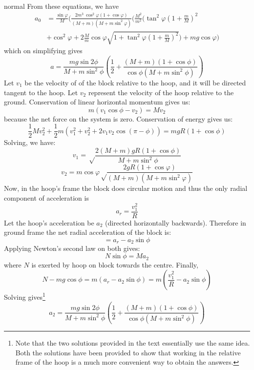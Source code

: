 \begin{solution}{normal}
From these equations, we have
\begin{align*}
a_0 &= \frac{\sin{\varphi}}{M} \Biggl(\frac{2m^3 \ \cos^2{\varphi} (1+\cos{\varphi})}{(M+m)(M+m\sin^2{\varphi})} \Biggl(\frac{M^2}{m^2} (\tan^2{\varphi} {\left(1+\frac{m}{M}\right)}^2 \\
&+ \cos^2{\varphi} + 2\frac{M}{m} \cos{\varphi} \sqrt{1+\tan^2{\varphi} {\left(1+\frac{m}{M}\right)}^2}\Biggr) +mg\cos{\varphi}\Biggr)
\end{align*}
which on simplifying gives
$$\boxed{a = \frac{mg\sin 2\phi}{M+m\sin^2\phi}\left ( \frac{1}{2}+\frac{(M+m)(1+\cos\phi)}{\cos\phi (M+m\sin^2\phi)} \right )}$$
\tcbline
Let $v_1$ be the velocity of of the block relative to the hoop, and it will be directed tangent to the hoop. Let $v_2$ represent the velocity of the hoop relative to the ground.
Conservation of linear horizontal momentum gives us:
$$m(v_{1}\cos \phi -v_{2})=Mv_{2}$$
because the net force on the system is zero. Conservation of energy gives us:
$$\frac{1}{2}Mv_{2}^2+\frac{1}{2}m(v_{1}^2+v_{2}^2+2v_{1}v_2 \cos(\pi-\phi))=mgR(1+\cos\phi)$$
Solving, we have:
$$v_{1}=\sqrt\frac{2(M+m)gR(1+\cos\phi)}{M+m\sin^2\phi}$$
$$\boxed{v_2 = m \cos{\varphi} \sqrt\frac{2gR(1+\cos\varphi)}{(M+m)(M+m\sin^2\varphi)}}$$
Now, in the hoop's frame the block does circular motion and thus the only radial component of acceleration is
$$a_{r}=\frac{v_1 ^2}{R}$$
Let the hoop's acceleration be $a_2$ (directed horizontally backwards). Therefore in ground frame the net radial acceleration of the block is:
$$=a_r -a_2 \sin \phi$$
Applying Newton's second law on both gives:
$$N\sin \phi=Ma_2$$
where $N$ is exerted by hoop on block towards the centre. Finally,
$$N-mg\cos\phi=m(a_r -a_2 \sin \phi)=m(\frac{v_1 ^2}{R}-a_2 \sin \phi)$$
Solving gives\footnote{Note that the two solutions provided in the text essentially use the same idea. Both the solutions have been provided to show that working in the relative frame of the hoop is a much more convenient way to obtain the answers.}
$$\boxed{a_2=\frac{mg\sin 2\phi}{M+m\sin^2\phi}\left ( \frac{1}{2}+\frac{(M+m)(1+\cos\phi)}{\cos\phi (M+m\sin^2\phi)} \right )}$$
\end{solution}
